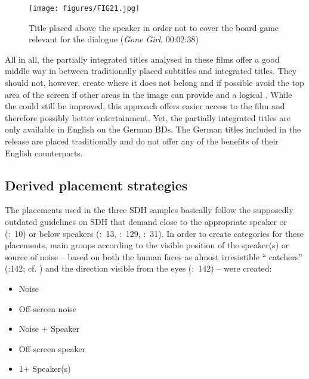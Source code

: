 \begin{figure}
\texttt{[image: figures/FIG21.jpg]}
\caption{Title placed above the speaker in order not to cover the board game relevant for the dialogue (\textit{Gone Girl}, 00:02:38)}
\label{fig:FIG21}
\end{figure}

\newpage 
All in all, the partially integrated titles analysed in these films offer a good middle way in between traditionally placed subtitles and integrated titles. They should not, however, create  where it does not belong and if possible avoid the top area of the screen if other areas in the image can provide  and a logical . While the  could still be improved, this approach offers easier access to the film and therefore possibly better entertainment. Yet, the partially integrated titles are only available in English on the German BDs. The German titles included in the release are placed traditionally and do not offer any of the benefits of their English counterparts.

\subsection{Derived placement strategies}\label{sec:4.1.3}

The placements used in the three SDH samples basically follow the supposedly outdated guidelines on SDH  that demand  close to the appropriate speaker or  (\citealt{Itc1999}:~10) or below speakers (\citealt{Itc1999}:~13, \citealt{Jungst2010}:~129, \citealt{remael2007}:~31). In order to create categories for these placements, main groups according to the visible position of the speaker(s) or source of noise – based on both the human faces as almost irresistible “ catchers” (\citealt{Lautenbacher2012}:142; cf. \citealt{Birmingham2008}) and the  direction visible from the eyes (\citealt{Lautenbacher2012}:~142) – were created:

\begin{itemize}
\item Noise
\item Off-screen noise
\item Noise + Speaker
\item Off-screen speaker
\item 1+ Speaker(s)
\end{itemize}

